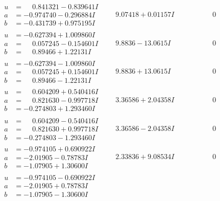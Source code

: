 \documentclass[1p]{elsarticle_modified}
\theoremstyle{definition}
\begin{document}
$$\begin{array}{c|c|c}
\begin{aligned}
u &= \phantom{-}0.841321 - 0.839641 I \\
a &= -0.974740 - 0.296884 I \\
b &= -0.431739 + 0.975195 I\end{aligned}
 & \phantom{-}9.07418 + 0.01157 I & \phantom{-0.000000 } 0 \\ \hline\begin{aligned}
u &= -0.627394 + 1.009860 I \\
a &= \phantom{-}0.057245 - 0.154601 I \\
b &= \phantom{-}0.89466 + 1.22131 I\end{aligned}
 & \phantom{-}9.8836 - 13.0615 I & \phantom{-0.000000 } 0 \\ \hline\begin{aligned}
u &= -0.627394 - 1.009860 I \\
a &= \phantom{-}0.057245 + 0.154601 I \\
b &= \phantom{-}0.89466 - 1.22131 I\end{aligned}
 & \phantom{-}9.8836 + 13.0615 I & \phantom{-0.000000 } 0 \\ \hline\begin{aligned}
u &= \phantom{-}0.604209 + 0.540416 I \\
a &= \phantom{-}0.821630 - 0.997718 I \\
b &= -0.274803 + 1.293460 I\end{aligned}
 & \phantom{-}3.36586 + 2.04358 I & \phantom{-0.000000 } 0 \\ \hline\begin{aligned}
u &= \phantom{-}0.604209 - 0.540416 I \\
a &= \phantom{-}0.821630 + 0.997718 I \\
b &= -0.274803 - 1.293460 I\end{aligned}
 & \phantom{-}3.36586 - 2.04358 I & \phantom{-0.000000 } 0 \\ \hline\begin{aligned}
u &= -0.974105 + 0.690922 I \\
a &= -2.01905 - 0.78783 I \\
b &= -1.07905 + 1.30600 I\end{aligned}
 & \phantom{-}2.33836 + 9.08534 I & \phantom{-0.000000 } 0 \\ \hline\begin{aligned}
u &= -0.974105 - 0.690922 I \\
a &= -2.01905 + 0.78783 I \\
b &= -1.07905 - 1.30600 I\end{aligned}

\end{array}$$
\end{document}
